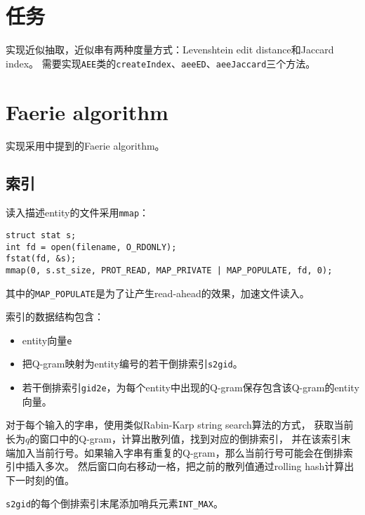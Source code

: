 \title{}
\author{MaskRay}
\maketitle

\section{任务}

实现近似抽取，近似串有两种度量方式：Levenshtein edit distance和Jaccard index。
需要实现\texttt{AEE}类的\texttt{createIndex}、\texttt{aeeED}、\texttt{aeeJaccard}三个方法。

\section{Faerie algorithm}

实现采用\cite{faerie}中提到的Faerie algorithm。

\subsection{索引}

读入描述entity的文件采用\texttt{mmap}：

\begin{verbatim}
struct stat s;
int fd = open(filename, O_RDONLY);
fstat(fd, &s);
mmap(0, s.st_size, PROT_READ, MAP_PRIVATE | MAP_POPULATE, fd, 0);
\end{verbatim}

其中的\texttt{MAP\_POPULATE}是为了让产生read-ahead的效果，加速文件读入。

索引的数据结构包含：

\begin{itemize}
  \item entity向量\texttt{e}
  \item 把Q-gram映射为entity编号的若干倒排索引\texttt{s2gid}。
  \item 若干倒排索引\texttt{gid2e}，为每个entity中出现的Q-gram保存包含该Q-gram的entity向量。
\end{itemize}

对于每个输入的字串，使用类似Rabin-Karp string search算法的方式，
获取当前长为$q$的窗口中的Q-gram，计算出散列值，找到对应的倒排索引，
并在该索引末端加入当前行号。如果输入字串有重复的Q-gram，那么当前行号可能会在倒排索引中插入多次。
然后窗口向右移动一格，把之前的散列值通过rolling hash计算出下一时刻的值。

\texttt{s2gid}的每个倒排索引末尾添加哨兵元素\texttt{INT\_MAX}。

